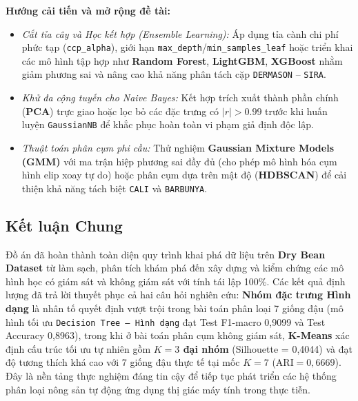 \documentclass[a4paper,12pt]{report}
\begin{document}
\textbf{Hướng cải tiến và mở rộng đề tài:}
\begin{itemize}[leftmargin=*]
    \item \textit{Cắt tỉa cây và Học kết hợp (Ensemble Learning):} Áp dụng tỉa cành chi phí phức tạp (\texttt{ccp\_alpha}), giới hạn \texttt{max\_depth}/\texttt{min\_samples\_leaf} hoặc triển khai các mô hình tập hợp như \textbf{Random Forest}, \textbf{LightGBM}, \textbf{XGBoost} nhằm giảm phương sai và nâng cao khả năng phân tách cặp \texttt{DERMASON} -- \texttt{SIRA}.
    \item \textit{Khử đa cộng tuyến cho Naive Bayes:} Kết hợp trích xuất thành phần chính (\textbf{PCA}) trực giao hoặc lọc bỏ các đặc trưng có $|r| > 0.99$ trước khi huấn luyện \texttt{GaussianNB} để khắc phục hoàn toàn vi phạm giả định độc lập.
    \item \textit{Thuật toán phân cụm phi cầu:} Thử nghiệm \textbf{Gaussian Mixture Models (GMM)} với ma trận hiệp phương sai đầy đủ (cho phép mô hình hóa cụm hình elip xoay tự do) hoặc phân cụm dựa trên mật độ (\textbf{HDBSCAN}) để cải thiện khả năng tách biệt \texttt{CALI} và \texttt{BARBUNYA}.
\end{itemize}

\subsection{Kết luận Chung}
Đồ án đã hoàn thành toàn diện quy trình khai phá dữ liệu trên \textbf{Dry Bean Dataset} từ làm sạch, phân tích khám phá đến xây dựng và kiểm chứng các mô hình học có giám sát và không giám sát với tính tái lập 100\%. Các kết quả định lượng đã trả lời thuyết phục cả hai câu hỏi nghiên cứu: \textbf{Nhóm đặc trưng Hình dạng} là nhân tố quyết định vượt trội trong bài toán phân loại 7 giống đậu (mô hình tối ưu \texttt{Decision Tree -- Hình dạng} đạt Test F1-macro 0,9099 và Test Accuracy 0,8963), trong khi ở bài toán phân cụm không giám sát, \textbf{K-Means} xác định cấu trúc tối ưu tự nhiên gồm \textbf{$K = 3$ đại nhóm} (Silhouette = 0,4044) và đạt độ tương thích khá cao với 7 giống đậu thực tế tại mốc $K = 7$ ($\text{ARI} = 0,6669$). Đây là nền tảng thực nghiệm đáng tin cậy để tiếp tục phát triển các hệ thống phân loại nông sản tự động ứng dụng thị giác máy tính trong thực tiễn.
\end{document}
